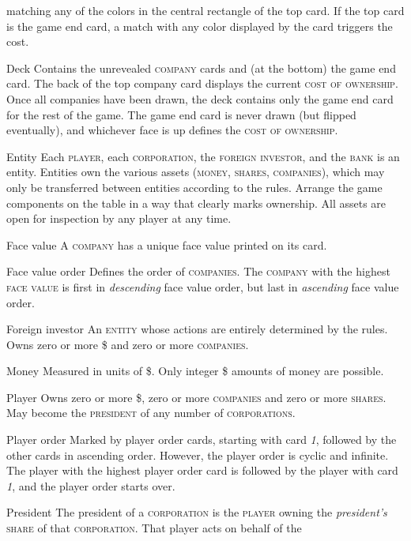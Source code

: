 \documentclass[11pt,a4paper]{article}
\newenvironment{my_description}
  {\begin{list}{}{\setlength{\labelwidth}{0pt}
   \leftmargin=1.2em
   \setlength{\itemindent}{-\leftmargin}
   \renewcommand{\makelabel}{\descriptionlabel}}
  \setlength{\itemsep}{1pt}
  \setlength{\parskip}{0pt}
  \setlength{\parsep}{0pt}
  }
  {\end{list}}
\begin{document}
\begin{multicols}{2}
{\begin{my_description}
  matching any of the colors in the central rectangle of the top
  card. If the top card is the game end card, a match with any color
  displayed by the card triggers the cost.
\item[Deck] Contains the unrevealed \textsc{company} cards and (at the
  bottom) the game end card. The back of the top company card displays
  the current \textsc{cost of ownership}. Once all companies have been
  drawn, the deck contains only the game end card for the rest of the
  game. The game end card is never drawn (but flipped eventually), and
  whichever face is up defines the \textsc{cost of ownership}.
\item[Entity] Each \textsc{player}, each \textsc{corporation}, the
  \textsc{foreign investor}, and the \textsc{bank} is an
  entity. Entities own the various assets (\textsc{money},
  \textsc{shares}, \textsc{companies}), which may only
  be transferred between entities according to the rules. Arrange the
  game components on the table in a way that clearly marks ownership.
  All assets are open for inspection by any player at any time.
\item[Face value] A \textsc{company} has a unique face value printed
  on its card.
\item[Face value order] Defines the order of \textsc{companies}.  The
  \textsc{company} with the highest \textsc{face value} is first in
  \emph{descending} face value order, but last in \emph{ascending}
  face value order.
\item[Foreign investor] An \textsc{entity} whose actions are entirely
  determined by the rules. Owns zero or more \$ and zero or more
  \textsc{companies}.
\item[Money] Measured in units of \$. Only integer \$ amounts of money
  are possible.
\item[Player] Owns zero or more \$, zero or more \textsc{companies}
  and zero or more \textsc{shares}. May become the \textsc{president}
  of any number of \textsc{corporations}.
\item[Player order] Marked by player order cards, starting with card
  \emph{1}, followed by the other cards in ascending order. However,
  the player order is cyclic and infinite. The player with the highest
  player order card is followed by the player with card \emph{1}, and
  the player order starts over.
\item[President] The president of a \textsc{corporation} is the
  \textsc{player} owning the \emph{president's} \textsc{share} of that
  \textsc{corporation}. That player acts on behalf of the

\end{my_description}}
\end{multicols}
\end{document}
